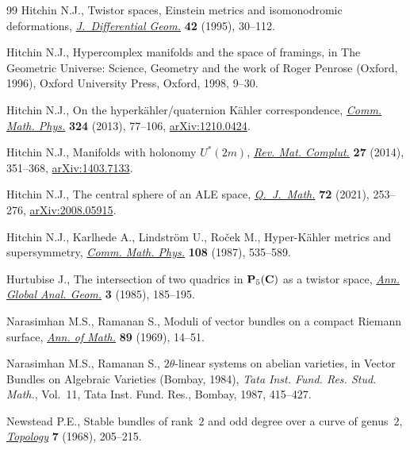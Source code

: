 \documentclass[10pt,a4paper]{amsart}
\numberwithin{equation}{section}
\begin{document}
\begin{thebibliography}{99}
Hitchin N.J., Twistor spaces, {E}instein metrics and isomonodromic
 deformations, \href{https://doi.org/10.4310/jdg/1214457032}{\textit{J.~Differential Geom.}} \textbf{42} (1995), 30--112.

Hitchin N.J., Hypercomplex manifolds and the space of framings, in The
 Geometric Universe: Science, Geometry and the work of Roger Penrose
 ({O}xford, 1996), Oxford University Press, Oxford, 1998, 9--30.

Hitchin N.J., On the hyperk\"ahler/quaternion {K}\"ahler correspondence,
 \href{https://doi.org/10.1007/s00220-013-1689-y}{\textit{Comm. Math. Phys.}} \textbf{324} (2013), 77--106, \href{https://arxiv.org/abs/1210.0424}{arXiv:1210.0424}.

Hitchin N.J., Manifolds with holonomy {$U^*(2m)$}, \href{https://doi.org/10.1007/s13163-014-0150-x}{\textit{Rev. Mat. Complut.}}
 \textbf{27} (2014), 351--368, \href{https://arxiv.org/abs/1403.7133}{arXiv:1403.7133}.

Hitchin N.J., The central sphere of an {ALE} space, \href{https://doi.org/10.1093/qmath/haaa051}{\textit{Q.~J.~Math.}}
 \textbf{72} (2021), 253--276, \href{https://arxiv.org/abs/2008.05915}{arXiv:2008.05915}.

Hitchin N.J., Karlhede A., Lindstr\"om U., Ro\v{c}ek M., Hyper-{K}\"ahler
 metrics and supersymmetry, \href{https://doi.org/10.1007/BF01214418}{\textit{Comm. Math. Phys.}} \textbf{108} (1987),
 535--589.

Hurtubise J., The intersection of two quadrics in {${\bf P}_5({\bf C})$} as a
 twistor space, \href{https://doi.org/10.1007/BF01000339}{\textit{Ann. Global Anal. Geom.}} \textbf{3} (1985), 185--195.

Narasimhan M.S., Ramanan S., Moduli of vector bundles on a compact {R}iemann
 surface, \href{https://doi.org/10.2307/1970807}{\textit{Ann. of Math.}} \textbf{89} (1969), 14--51.

Narasimhan M.S., Ramanan S., {$2\theta$}-linear systems on abelian varieties,
 in Vector Bundles on Algebraic Varieties ({B}ombay, 1984), \textit{Tata Inst.
 Fund. Res. Stud. Math.}, Vol.~11, Tata Inst. Fund. Res., Bombay, 1987,
 415--427.

Newstead P.E., Stable bundles of rank~{$2$} and odd degree over a curve of
 genus~{$2$}, \href{https://doi.org/10.1016/0040-9383(68)90001-3}{\textit{Topology}} \textbf{7} (1968), 205--215.


\end{thebibliography}
\end{document}
